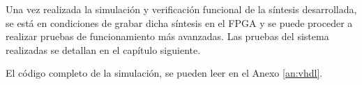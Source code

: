 Una vez realizada la simulación y verificación funcional de la síntesis desarrollada, se está en condiciones de grabar dicha síntesis en el FPGA y se puede proceder a realizar pruebas de funcionamiento más avanzadas. Las pruebas del sistema realizadas se detallan en el capítulo siguiente.

El código completo de la simulación, se pueden leer en el Anexo \ref{an:vhdl}.